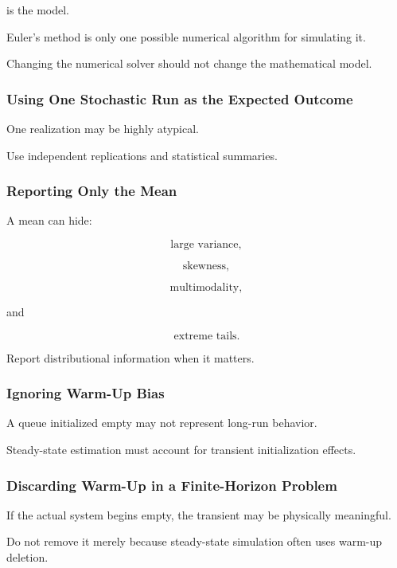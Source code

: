 is the model.

Euler's method is only one possible numerical algorithm for simulating it.

Changing the numerical solver should not change the mathematical model.

\subsubsection{Using One Stochastic Run as the Expected Outcome}

One realization may be highly atypical.

Use independent replications and statistical summaries.

\subsubsection{Reporting Only the Mean}

A mean can hide:

\[
\boxed{
\text{large variance},
}
\]

\[
\boxed{
\text{skewness},
}
\]

\[
\boxed{
\text{multimodality},
}
\]

and

\[
\boxed{
\text{extreme tails}.
}
\]

Report distributional information when it matters.

\subsubsection{Ignoring Warm-Up Bias}

A queue initialized empty may not represent long-run behavior.

Steady-state estimation must account for transient initialization effects.

\subsubsection{Discarding Warm-Up in a Finite-Horizon Problem}

If the actual system begins empty, the transient may be physically
meaningful.

Do not remove it merely because steady-state simulation often uses
warm-up deletion.

